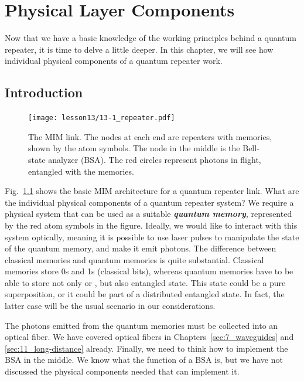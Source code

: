 \chapter{Physical Layer Components}
\label{sec:physical-layer-components}

Now that we have a basic knowledge of the working principles behind a quantum repeater, it is time to delve a little deeper.
In this chapter, we will see how individual physical components of a quantum repeater work.





\section{Introduction}
\label{sec:phys_layer_intro}

\begin{figure}[t]
    \centering
    \texttt{[image: lesson13/13-1\_repeater.pdf]}
    \caption[MIM link hardware.]{The MIM link. The nodes at each end are repeaters with memories, shown by the atom symbols.  The node in the middle is the Bell-state analyzer (BSA). The red circles represent photons in flight, entangled with the memories.}
    \label{fig:13-MIM-link}
\end{figure}


Fig.~\ref{fig:13-MIM-link} shows the basic MIM architecture for a quantum repeater link.
What are the individual physical components of a quantum repeater system?
We require a physical system that can be used as a suitable \textbf{\emph{quantum memory}}, represented by the red atom symbols in the figure.
Ideally, we would like to interact with this system optically, meaning it is possible to use laser pulses to manipulate the state of the quantum memory, and make it emit photons.
The difference between classical memories and quantum memories is quite substantial.
Classical memories store 0s and 1s (classical bits), whereas quantum memories have to be able to store not only  or , but also entangled state. 
This state could be a pure superposition, or it could be part of a distributed entangled state.
In fact, the latter case will be the usual scenario in our considerations.

The photons emitted from the quantum memories must be collected into an optical fiber.
We have covered optical fibers in Chapters~\ref{sec:7_waveguides} and \ref{sec:11_long-distance} already.
Finally, we need to think how to implement the BSA in the middle.
We know what the function of a BSA is, but we have not discussed the physical components needed that can implement it.

